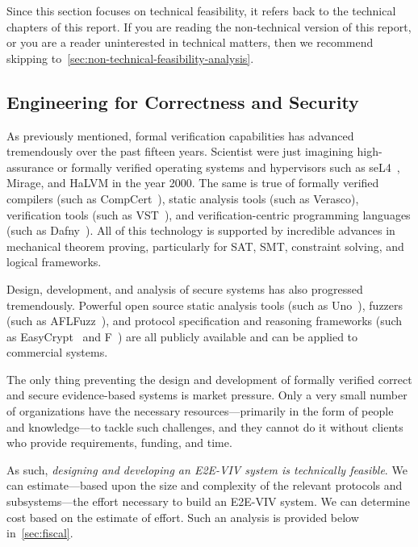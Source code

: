 Since this section focuses on technical feasibility, it refers back to
the technical chapters of this report.  If you are reading the
non-technical version of this report, or you are a reader uninterested
in technical matters, then we recommend skipping
to~\autoref{sec:non-technical-feasibility-analysis}.

\subsection{Engineering for Correctness and Security}

As previously mentioned, formal verification capabilities has advanced
tremendously over the past fifteen years. Scientist were just
imagining high-assurance or formally verified operating systems and
hypervisors such as seL4~\cite{klein2009sel4}, Mirage, and HaLVM in
the year 2000. The same is true of formally verified compilers (such
as CompCert~\cite{CompCert}), static analysis tools (such as Verasco),
verification tools (such as VST~\cite{VST}), and verification-centric
programming languages (such as Dafny~\cite{Dafny}). All of this
technology is supported by incredible advances in mechanical theorem
proving, particularly for SAT, SMT, constraint solving, and logical
frameworks.

Design, development, and analysis of secure systems has also
progressed tremendously. Powerful open source static analysis tools
(such as Uno~\cite{holzmann2002static}), fuzzers (such as
AFLFuzz~\cite{AFLFuzz}), and protocol specification and reasoning
frameworks (such as EasyCrypt~\cite{EasyCrypt} and F\*~\cite{Fstar})
are all publicly available and can be applied to commercial systems.

The only thing preventing the design and development of
formally verified correct and secure evidence-based systems is market
pressure. Only a very small number of organizations have the necessary
resources---primarily in the form of people and knowledge---to tackle
such challenges, and they cannot do it without clients who provide
requirements, funding, and time.

As such, \emph{designing and developing an E2E-VIV system is
  technically feasible}.  We can estimate---based upon the size and
complexity of the relevant protocols and subsystems---the effort
necessary to build an E2E-VIV system.  We can determine cost based on
the estimate of effort. Such an analysis is provided below
in~\autoref{sec:fiscal}.

